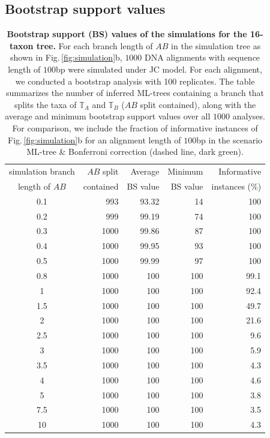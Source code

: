 \begin{appendices}
\subsection{Bootstrap support values}
\begin{table}[hb]
    \centering
    \begin{tabular}{|c|r|r|r|r|}
\hline
simulation branch & $AB$ split & Average  & Minimum & Informative\\
length of $AB$& contained   & BS value & BS value & instances (\%) \\
\hline
0.1 &  993 &  93.32 &  14 & 100   \\
0.2 &  999 &  99.19 &  74 & 100  \\
0.3 & 1000 &  99.86 &  87 & 100   \\
0.4 & 1000 &  99.95 &  93 & 100 \\
0.5 & 1000 &  99.99 &  97 & 100   \\
0.8 & 1000 & 100  & 100 &  99.1 \\
1   & 1000 & 100  & 100 &  92.4 \\
1.5 & 1000 & 100  & 100 &  49.7 \\
2   & 1000 & 100  & 100 &  21.6 \\
2.5 & 1000 & 100  & 100 &   9.6 \\
3   & 1000 & 100  & 100 &   5.9 \\
3.5 & 1000 & 100  & 100 &   4.3 \\
4   & 1000 & 100  & 100 &   4.6 \\
5   & 1000 & 100  & 100 &   3.8 \\
7.5 & 1000 & 100  & 100 &   3.5 \\
10  & 1000 & 100  & 100 &   4.3 \\
\hline
    \end{tabular}
    \vspace{0.25cm}
    \caption{
        \textbf{Bootstrap support (BS) values of the simulations for the 16-taxon tree.} For each branch length of $AB$ in the simulation tree as shown in Fig.\,\ref{fig:simulation}b, $1000$ DNA alignments with sequence length of $100$bp were simulated under JC model. For each alignment, we conducted a bootstrap analysis with 100 replicates. The table summarizes the number of inferred ML-trees containing a branch that splits the taxa of $\mathbb{T}_A$ and $\mathbb{T}_B$ ($AB$ split contained), along with the average  and minimum bootstrap support values over all $1000$ analyses.  For comparison, we include the fraction of informative instances of Fig.\,\ref{fig:simulation}b for an alignment length of $100$bp in the scenario  ML-tree \& Bonferroni correction (dashed line, {\color{MLtreeBonferroni} dark green}). 
    }
    \label{supptab:bootstrap}
    \end{table}


\end{appendices}
